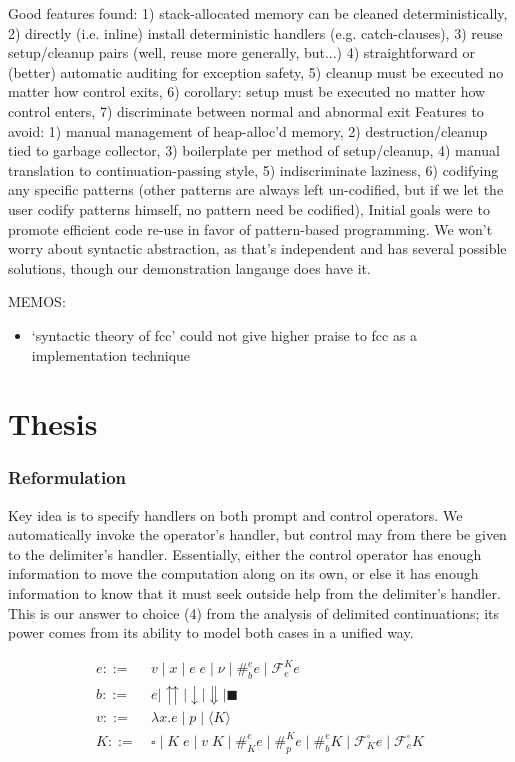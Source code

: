 \documentclass[11pt]{article}
\newcommand\x{\lambda x}
\newcommand\F{\mathcal{F}}
\newcommand{\angles}[1]{\langle#1\rangle}
\begin{document}
Good features found:
  1) stack-allocated memory can be cleaned deterministically,
  2) directly (i.e. inline) install deterministic handlers (e.g. catch-clauses),
  3) reuse setup/cleanup pairs (well, reuse more generally, but...)
  4) straightforward or (better) automatic auditing for exception safety,
  5) cleanup must be executed no matter how control exits,
  6) corollary: setup must be executed no matter how control enters,
  7) discriminate between normal and abnormal exit
Features to avoid:
  1) manual management of heap-alloc'd memory,
  2) destruction/cleanup tied to garbage collector,
  3) boilerplate per method of setup/cleanup,
  4) manual translation to continuation-passing style,
  5) indiscriminate laziness,
  6) codifying any specific patterns (other patterns are always left un-codified, but if we let the user codify patterns himself, no pattern need be codified),
Initial goals were to promote efficient code re-use in favor of pattern-based programming.
We won't worry about syntactic abstraction, as that's independent and has several possible solutions, though our demonstration langauge does have it.


MEMOS:
\begin{itemize}
\item `syntactic theory of fcc' could not give higher praise to fcc as a implementation technique
\end{itemize}



\part{Thesis}

\section{Reformulation}

Key idea is to specify handlers on both prompt and control operators.
We automatically invoke the operator's handler, but control may from there be given to the delimiter's handler.
Essentially, either the control operator has enough information to move the computation along on its own, or else it has enough information to know that it must seek outside help from the delimiter's handler.
This is our answer to choice (4) from the analysis of delimited continuations; its power comes from its ability to model both cases in a unified way.


\begin{align*}
e ::=&\ v \mid x \mid e\;e \mid \nu \mid \#^e_be \mid \mathcal{F}^K_ee \\
b ::=&\ e \mid {\upuparrows} \mid {\downarrow} \mid {\Downarrow} \mid {\blacksquare} \\
v ::=&\ \x.e \mid p \mid \angles K \\
K ::=&\ \square \mid K\;e \mid v\;K \mid \#_K^ee \mid \#_p^Ke \mid \#_b^eK \mid \F^\square_Ke \mid \F_e^\square K\\
\end{align*}
\end{document}
